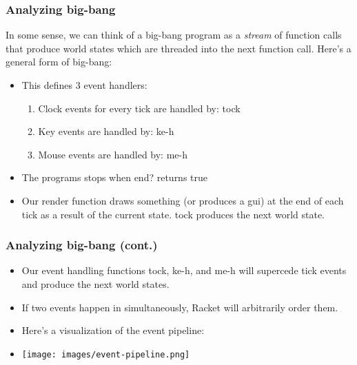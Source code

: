 \documentclass{beamer}
\begin{document}

\begin{frame}
  \frametitle{Analyzing big-bang}
  In some sense, we can think of a big-bang program as a \emph{stream}
  of function calls that produce world states which are threaded into the next
  function call. Here's a general form of big-bang:
  \pause
  \generalForm
  \begin{itemize}
    \item<3-> This defines 3 event handlers:
      \begin{enumerate}
      \item<4-> Clock events for every tick are handled by: tock
      \item<5-> Key events are handled by: ke-h
      \item<6-> Mouse events are handled by: me-h
      \end{enumerate}
    \item<7-> The programs stops when end? returns true
    \item<8-> Our render function draws something (or produces a gui)
      at the end of each tick as a result of the current state. tock
      produces the next world state.
  \end{itemize}
\end{frame}

\begin{frame}
  \frametitle{Analyzing big-bang (cont.)}
  \begin{itemize}
  \item<1-> Our event handling functions tock, ke-h, and me-h will supercede tick events and produce the next world states.
  \item<2-> If two events happen in simultaneously, Racket will arbitrarily order them.
  \item<3-> Here's a visualization of the event pipeline:
  \item<4-> \texttt{[image: images/event-pipeline.png]}
  \end{itemize}
\end{frame}

\end{document}
